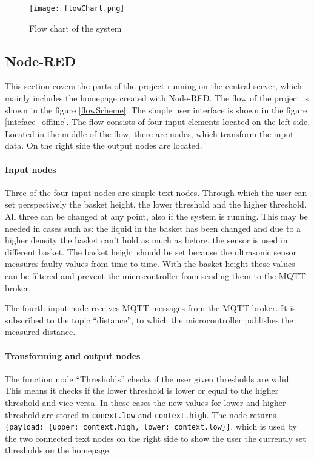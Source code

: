\documentclass{article}
\begin{document}
\begin{figure}[]
		\center \texttt{[image: flowChart.png]}
		\caption{Flow chart of the system}
		\label{flowChart}
\end{figure}

\subsection{Node-RED}
This section covers the parts of the project running on the central server, which
mainly includes the homepage created with Node-RED. The flow of the project is shown in the figure \ref{flowScheme}. The simple user interface is shown in the figure \ref{inteface_offline}. The flow consists of four input elements located on the left side. Located in the middle of the flow, there are nodes, which transform the input data. On the right side the output nodes are located.\par

\paragraph{Input nodes}\mbox{}

Three of the four input nodes are simple text nodes. Through which the user can set perspectively
the basket height, the lower threshold and the higher threshold. All three can be changed at any point, also if the system is running. This may be needed in cases such as: the liquid in the basket has been changed and due to a higher density the basket can't hold as much as before, the sensor is used in different basket. The basket height should be set because the ultrasonic sensor measures
faulty values from time to time. With the basket height these values can be filtered and prevent the
microcontroller from sending them to the MQTT broker.

The fourth input node receives MQTT messages from the MQTT broker. It is subscribed to the topic \enquote{distance}, to which the microcontroller publishes the measured distance.

\paragraph{Transforming and output nodes}\mbox{}
\label{sec:json}
The function node \enquote{Thresholds} checks if the user given
thresholds are valid. This means it checks if the lower threshold is lower or
equal to the higher threshold and vice versa. In these cases the
new values for lower and higher threshold are stored in \verb|conext.low| and
\verb|context.high|. The node returns 
\verb|{payload: {upper: context.high, lower: context.low}}|, which is used by the
two connected text nodes on the right side to show the user the currently set thresholds on the homepage.
\end{document}
